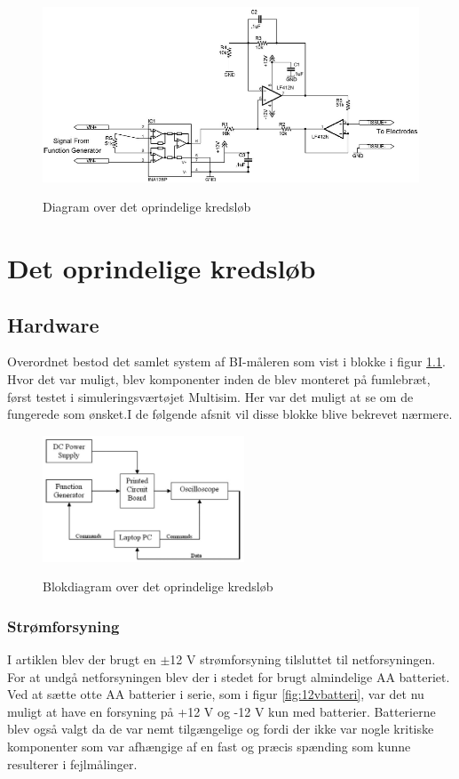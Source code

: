 \begin{figure}[H]
\centering
{\includegraphics[width=12cm]
{Figure/BIdiagram}}
\caption{Diagram over det oprindelige kredsløb\cite{Aroom2009}}
\label{fig:BIdiagram}
\end{figure}


\chapter{Det oprindelige kredsløb}
\section{Hardware}

Overordnet bestod det samlet system af BI-måleren som vist i blokke i figur \ref{fig:oprindeligebd}. Hvor det var muligt, blev komponenter inden de blev monteret på fumlebræt, først testet i simuleringsværtøjet Multisim. Her var det muligt at se om de fungerede som ønsket.I de følgende afsnit vil disse blokke blive bekrevet nærmere. 

\begin{figure}[H]
\centering
{\includegraphics[width=6cm]
{Figure/oprindeligebd}}
\caption{Blokdiagram over det oprindelige kredsløb\cite{Aroom2009}}
\label{fig:oprindeligebd}
\end{figure}

\subsection{Strømforsyning}
I artiklen  blev der brugt en $\pm$12 V strømforsyning tilsluttet til netforsyningen. For at undgå netforsyningen blev der i stedet for brugt almindelige AA batteriet. Ved at sætte otte AA batterier i serie, som i figur \ref{fig:12vbatteri}, var det nu muligt at have en forsyning på +12 V og -12 V kun med batterier. Batterierne blev også valgt da de var nemt tilgængelige og fordi der ikke var nogle kritiske komponenter som var afhængige af en fast og præcis spænding som kunne resulterer i fejlmålinger. 

